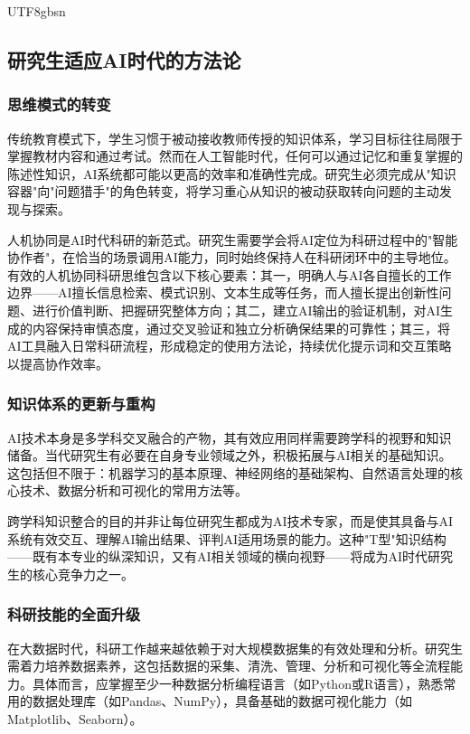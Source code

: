 \documentclass[12pt,a4paper]{article}
\begin{document}
\begin{CJK}{UTF8}{gbsn}
\subsection{研究生适应AI时代的方法论}

\subsubsection{思维模式的转变}

传统教育模式下，学生习惯于被动接收教师传授的知识体系，学习目标往往局限于掌握教材内容和通过考试。然而在人工智能时代，任何可以通过记忆和重复掌握的陈述性知识，AI系统都可能以更高的效率和准确性完成。研究生必须完成从"知识容器"向"问题猎手"的角色转变，将学习重心从知识的被动获取转向问题的主动发现与探索。

人机协同是AI时代科研的新范式。研究生需要学会将AI定位为科研过程中的"智能协作者"，在恰当的场景调用AI能力，同时始终保持人在科研闭环中的主导地位。有效的人机协同科研思维包含以下核心要素：其一，明确人与AI各自擅长的工作边界——AI擅长信息检索、模式识别、文本生成等任务，而人擅长提出创新性问题、进行价值判断、把握研究整体方向；其二，建立AI输出的验证机制，对AI生成的内容保持审慎态度，通过交叉验证和独立分析确保结果的可靠性；其三，将AI工具融入日常科研流程，形成稳定的使用方法论，持续优化提示词和交互策略以提高协作效率。

\subsubsection{知识体系的更新与重构}

AI技术本身是多学科交叉融合的产物，其有效应用同样需要跨学科的视野和知识储备。当代研究生有必要在自身专业领域之外，积极拓展与AI相关的基础知识。这包括但不限于：机器学习的基本原理、神经网络的基础架构、自然语言处理的核心技术、数据分析和可视化的常用方法等。

跨学科知识整合的目的并非让每位研究生都成为AI技术专家，而是使其具备与AI系统有效交互、理解AI输出结果、评判AI适用场景的能力。这种"T型"知识结构——既有本专业的纵深知识，又有AI相关领域的横向视野——将成为AI时代研究生的核心竞争力之一。

\subsubsection{科研技能的全面升级}

在大数据时代，科研工作越来越依赖于对大规模数据集的有效处理和分析。研究生需着力培养数据素养，这包括数据的采集、清洗、管理、分析和可视化等全流程能力。具体而言，应掌握至少一种数据分析编程语言（如Python或R语言），熟悉常用的数据处理库（如Pandas、NumPy），具备基础的数据可视化能力（如Matplotlib、Seaborn）。


\end{CJK}
\end{document}
